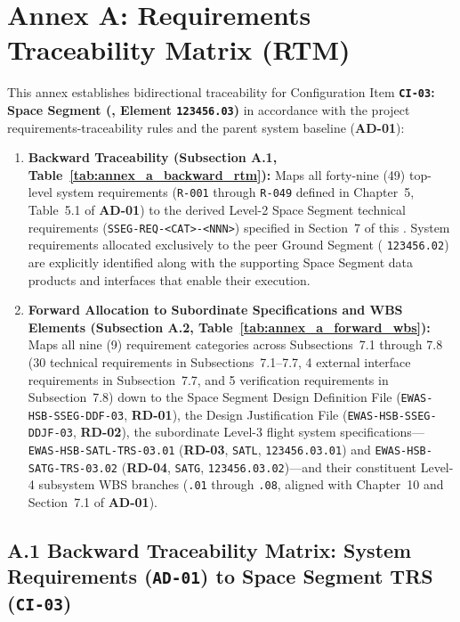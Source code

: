 \section{Annex A: Requirements Traceability Matrix (RTM)}

This annex establishes bidirectional traceability for Configuration Item \textbf{\texttt{CI-03}: Space Segment (,  Element \texttt{123456.03})} in accordance with the project requirements-traceability rules and the parent system baseline (\textbf{AD-01}):
\begin{enumerate}
    \item \textbf{Backward Traceability (Subsection A.1, Table~\ref{tab:annex_a_backward_rtm}):} Maps all forty-nine (49) top-level system requirements (\texttt{R-001} through \texttt{R-049} defined in Chapter~5, Table~5.1 of \textbf{AD-01}) to the derived Level-2 Space Segment technical requirements (\texttt{SSEG-REQ-<CAT>-<NNN>}) specified in Section~7 of this . System requirements allocated exclusively to the peer Ground Segment ( \texttt{123456.02}) are explicitly identified along with the supporting Space Segment data products and interfaces that enable their execution.
    \item \textbf{Forward Allocation to Subordinate Specifications and WBS Elements (Subsection A.2, Table~\ref{tab:annex_a_forward_wbs}):} Maps all nine (9)  requirement categories across Subsections~7.1 through 7.8 (30 technical requirements in Subsections~7.1--7.7, 4 external interface requirements in Subsection~7.7, and 5 verification requirements in Subsection~7.8) down to the Space Segment Design Definition File (\texttt{EWAS-HSB-SSEG-DDF-03}, \textbf{RD-01}), the Design Justification File (\texttt{EWAS-HSB-SSEG-DDJF-03}, \textbf{RD-02}), the subordinate Level-3 flight system specifications---\texttt{EWAS-HSB-SATL-TRS-03.01} (\textbf{RD-03}, \texttt{SATL},  \texttt{123456.03.01}) and \texttt{EWAS-HSB-SATG-TRS-03.02} (\textbf{RD-04}, \texttt{SATG},  \texttt{123456.03.02})---and their constituent Level-4 subsystem WBS branches (\texttt{.01} through \texttt{.08}, aligned with Chapter~10 and Section~7.1 of \textbf{AD-01}).
\end{enumerate}

\subsection{A.1 Backward Traceability Matrix: System Requirements (\texttt{AD-01}) to Space Segment TRS (\texttt{CI-03})}

